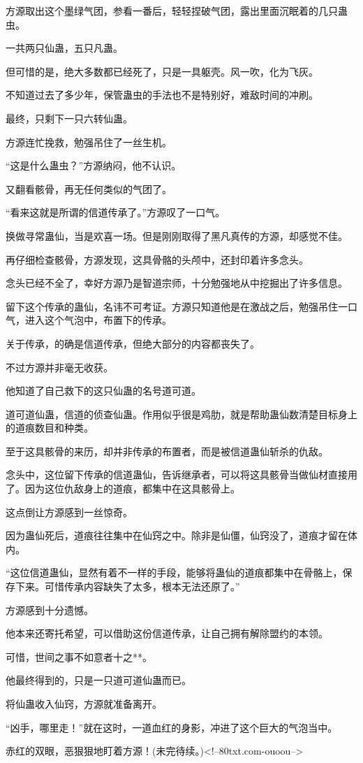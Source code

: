 \begin{this_body}
方源取出这个墨绿气团，参看一番后，轻轻捏破气团，露出里面沉眠着的几只蛊虫。

一共两只仙蛊，五只凡蛊。

但可惜的是，绝大多数都已经死了，只是一具躯壳。风一吹，化为飞灰。

不知道过去了多少年，保管蛊虫的手法也不是特别好，难敌时间的冲刷。

最终，只剩下一只六转仙蛊。

方源连忙挽救，勉强吊住了一丝生机。

“这是什么蛊虫？”方源纳闷，他不认识。

又翻看骸骨，再无任何类似的气团了。

“看来这就是所谓的信道传承了。”方源叹了一口气。

换做寻常蛊仙，当是欢喜一场。但是刚刚取得了黑凡真传的方源，却感觉不佳。

再仔细检查骸骨，方源发现，这具骨骼的头颅中，还封印着许多念头。

念头已经不全了，幸好方源乃是智道宗师，十分勉强地从中挖掘出了许多信息。

留下这个传承的蛊仙，名讳不可考证。方源只知道他是在激战之后，勉强吊住一口气，进入这个气泡中，布置下的传承。

关于传承，的确是信道传承，但绝大部分的内容都丧失了。

不过方源并非毫无收获。

他知道了自己救下的这只仙蛊的名号道可道。

道可道仙蛊，信道的侦查仙蛊。作用似乎很是鸡肋，就是帮助蛊仙数清楚目标身上的道痕数目和种类。

至于这具骸骨的来历，却并非传承的布置者，而是被信道蛊仙斩杀的仇敌。

念头中，这位留下传承的信道蛊仙，告诉继承者，可以将这具骸骨当做仙材直接用了。因为这位仇敌身上的道痕，都集中在这具骸骨上。

这点倒让方源感到一丝惊奇。

因为蛊仙死后，道痕往往集中在仙窍之中。除非是仙僵，仙窍没了，道痕才留在体内。

“这位信道蛊仙，显然有着不一样的手段，能够将蛊仙的道痕都集中在骨骼上，保存下来。可惜传承内容缺失了太多，根本无法还原了。”

方源感到十分遗憾。

他本来还寄托希望，可以借助这份信道传承，让自己拥有解除盟约的本领。

可惜，世间之事不如意者十之**。

他最终得到的，只是一只道可道仙蛊而已。

将仙蛊收入仙窍，方源就准备离开。

“凶手，哪里走！”就在这时，一道血红的身影，冲进了这个巨大的气泡当中。

赤红的双眼，恶狠狠地盯着方源！(未完待续。)<!--80txt.com-ouoou-->

\end{this_body}


